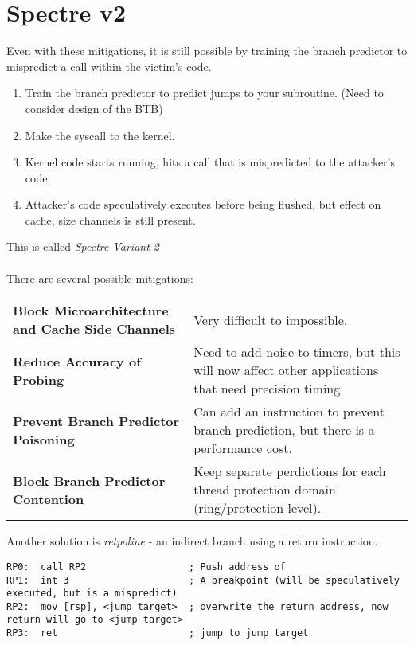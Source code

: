 \section{Spectre v2}
Even with these mitigations, it is still possible by training the branch predictor to mispredict a call within the victim's code.
\begin{enumerate}
	\item Train the branch predictor to predict jumps to your subroutine. (Need to consider design of the BTB)
	\item Make the syscall to the kernel.
	\item Kernel code starts running, hits a call that is mispredicted to the attacker's code.
	\item Attacker's code speculatively executes before being flushed, but effect on cache, size channels is still present.
\end{enumerate}
This is called \textit{Spectre Variant 2}
\\
\\ There are several possible mitigations:
\begin{center}
	\begin{tabular}{p{} p{}}
		\textbf{Block Microarchitecture and Cache Side Channels} & Very difficult to impossible.                                                                        \\
		\textbf{Reduce Accuracy of Probing}                      & Need to add noise to timers, but this will now affect other applications that need precision timing. \\
		\textbf{Prevent Branch Predictor Poisoning}              & Can add an instruction to prevent branch prediction, but there is a performance cost.                \\
		\textbf{Block Branch Predictor Contention}               & Keep separate perdictions for each thread protection domain (ring/protection level).                 \\
	\end{tabular}
\end{center}
Another solution is \textit{retpoline} - an indirect branch using a return instruction.
\begin{verbatim}
RP0:  call RP2                  ; Push address of 
RP1:  int 3                     ; A breakpoint (will be speculatively executed, but is a mispredict)
RP2:  mov [rsp], <jump target>  ; overwrite the return address, now return will go to <jump target>
RP3:  ret                       ; jump to jump target
\end{verbatim}


